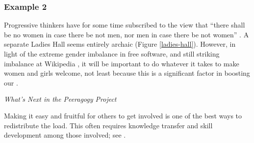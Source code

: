 \subsubsection*{Example 2}
Progressive thinkers have for some time subscribed to the view that
``there shall be no women in case there be not men, nor men in case
there be not women'' \cite[Chapter 1.LII]{rabelais1894gargantua}.  A
separate Ladies Hall seems entirely archaic (Figure
\ref{ladies-hall}).  However, in light of the extreme gender imbalance
in free software, and still striking imbalance at Wikipedia
\cite{gender,FM4291}, it will be important to do whatever it takes to
make women and girls welcome, not least because this is a significant
factor in boosting our .

\endgroup


\begin{framed}
\noindent 
\emph{What's Next in the Peeragogy Project}
\begin{collectinmacro}{\CarryingWN}{}{}
Making it easy and fruitful for others to get involved is one of the best ways to redistribute the load.  This often requires knowledge transfer and skill development among those involved; see .
\end{collectinmacro}
\CarryingWN
\end{framed}


